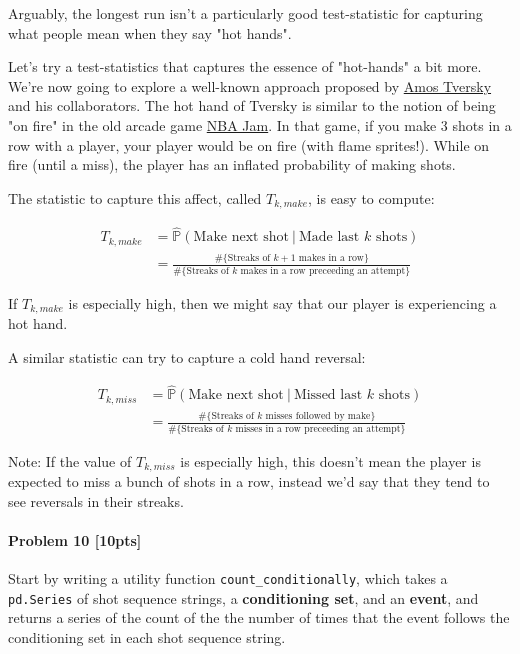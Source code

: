 \documentclass[11pt]{article}
\begin{document}
Arguably, the longest run isn't a particularly good test-statistic for
capturing what people mean when they say "hot hands".

Let's try a test-statistics that captures the essence of "hot-hands" a
bit more. We're now going to explore a well-known approach proposed by
\href{https://en.wikipedia.org/wiki/Amos_Tversky}{Amos Tversky} and his
collaborators. The hot hand of Tversky is similar to the notion of being
"on fire" in the old arcade game
\href{https://www.youtube.com/watch?v=ipzstdPtxNw}{NBA Jam}. In that
game, if you make 3 shots in a row with a player, your player would be
on fire (with flame sprites!). While on fire (until a miss), the player
has an inflated probability of making shots.

The statistic to capture this affect, called \(T_{k, make}\), is easy to
compute:

\begin{align*}
  T_{k, make}
  & = \hat{\mathbb{P}}(\text{Make next shot}\ \vert\ \text{Made last $k$ shots})\\
  & = \frac{\#\{\text{Streaks of $k+1$ makes in a row}\}}{\#\{\text{Streaks of $k$ makes in a row preceeding an attempt}\}}
\end{align*}

If \(T_{k, make}\) is especially high, then we might say that our player
is experiencing a hot hand.

A similar statistic can try to capture a cold hand reversal:

\begin{align*}
  T_{k, miss}
  & = \hat{\mathbb{P}}(\text{Make next shot}\ \vert\ \text{Missed last $k$ shots})\\
  & = \frac{\#\{\text{Streaks of $k$ misses followed by make}\}}{\#\{\text{Streaks of $k$ misses in a row preceeding an attempt}\}}
\end{align*}

Note: If the value of \(T_{k, miss}\) is especially high, this doesn't
mean the player is expected to miss a bunch of shots in a row, instead
we'd say that they tend to see reversals in their streaks.

\paragraph{Problem 10 {[}10pts{]}}\label{problem-10-10pts}

Start by writing a utility function \texttt{count\_conditionally}, which
takes a \texttt{pd.Series} of shot sequence strings, a
\textbf{conditioning set}, and an \textbf{event}, and returns a series
of the count of the the number of times that the event follows the
conditioning set in each shot sequence string.
\end{document}
